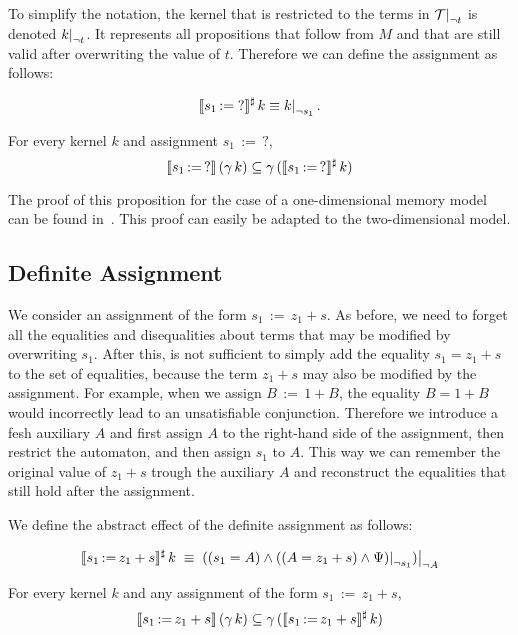To simplify the notation, the kernel that is restricted to the terms in $\restr{\T}{\neg t}$ is denoted $\restr{k}{\neg t}$.
It represents all propositions that follow from $M$ and that are still valid after overwriting the value of $t$.
Therefore we can define the assignment as follows:

\[
	\sem{s_1\,{:=}\;?}^\sharp\,k \equiv \restr{k}{\neg s_1}.
\]

\begin{proposition}\label{p:ass-unknown}
	For every kernel $k$ and assignment $s_1\,{:=}\,?$,
	\[
		\llbracket s_1\,{:=}\,?\rrbracket\,(\gamma\,k) \subseteq \gamma\,(\llbracket s_1\,{:=}\,?\rrbracket^\sharp\,k)
	\]
\end{proposition}

The proof of this proposition for the case of a one-dimensional memory model can be found in~\cite{2pointer}.
This proof can easily be adapted to the two-dimensional model.

\subsection{Definite Assignment}

We consider an assignment of the form $s_1\,{:=}\,z_1+s$.
As before, we need to forget all the equalities and disequalities about terms that may be modified by overwriting $s_1$.
After this, is not sufficient to simply add the equality $s_1 = z_1+s$ to the set of equalities,
because the term $z_1 + s$ may also be modified by the assignment. For example, when we assign $B\,{:=}\,1+B$, the equality $B = 1 + B$ would incorrectly lead to an unsatisfiable conjunction.
Therefore we introduce a fesh auxiliary $A$ and first assign $A$ to the right-hand side of the assignment, then restrict the automaton, and then assign $s_1$ to $A$.
This way we can remember the original value of $z_1 + s$ trough the auxiliary $A$ and reconstruct the equalities that still hold after the assignment.

We define the abstract effect of the definite assignment as follows:

\[
	\sem{s_1\,{:=}\,z_1+s}^\sharp\,k\;\equiv\;
	\restr{((s_1=A)\land\restr{((A=z_1+s)\land\Psi)}{\neg s_1})}{\neg A}
\]

\begin{proposition}\label{p:ass-definite}
	For every kernel $k$ and any assignment of the form $s_1\,{:=}\,z_1+s$,
	\[
		\llbracket s_1\,{:=}\,z_1+s\rrbracket\,(\gamma\,k) \subseteq \gamma\,(\llbracket s_1\,{:=}\,z_1+s\rrbracket^\sharp\,k)
	\]
\end{proposition}


